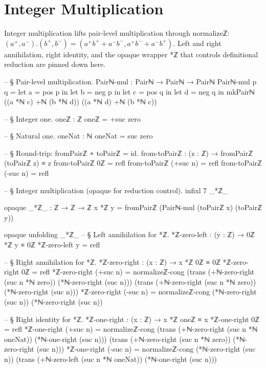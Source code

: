 \documentclass[11pt,a4paper]{book}
\def\cdot{.}%
\def\texttt#1{#1}%
\begin{document}
\section{Integer Multiplication}

Integer multiplication lifts pair-level multiplication through \texttt{normalizeℤ}:
$(a^+,a^-) \cdot (b^+,b^-) = (a^+ b^+ + a^- b^-, a^+ b^- + a^- b^+)$.
Left and right annihilation, right identity, and the opaque wrapper \texttt{*ℤ} that controls definitional reduction are pinned down here.

\begin{code}
-- § Pair-level multiplication.
Pairℕ-mul : Pairℕ → Pairℕ → Pairℕ
Pairℕ-mul p q =
  let a = pos p in
  let b = neg p in
  let c = pos q in
  let d = neg q in
  mkPairℕ ((a *ℕ c) +ℕ (b *ℕ d)) ((a *ℕ d) +ℕ (b *ℕ c))

-- § Integer one.
oneℤ : ℤ
oneℤ = +suc zero

-- § Natural one.
oneNat : ℕ
oneNat = suc zero

-- § Round-trip: fromPairℤ ∘ toPairℤ = id.
from-toPairℤ : (z : ℤ) → fromPairℤ (toPairℤ z) ≡ z
from-toPairℤ 0ℤ = refl
from-toPairℤ (+suc n) = refl
from-toPairℤ (-suc n) = refl

-- § Integer multiplication (opaque for reduction control).
infixl 7 _*ℤ_

opaque
  _*ℤ_ : ℤ → ℤ → ℤ
  x *ℤ y = fromPairℤ (Pairℕ-mul (toPairℤ x) (toPairℤ y))

opaque
  unfolding _*ℤ_
  -- § Left annihilation for *ℤ.
  *ℤ-zero-left : (y : ℤ) → 0ℤ *ℤ y ≡ 0ℤ
  *ℤ-zero-left y = refl

  -- § Right annihilation for *ℤ.
  *ℤ-zero-right : (x : ℤ) → x *ℤ 0ℤ ≡ 0ℤ
  *ℤ-zero-right 0ℤ = refl
  *ℤ-zero-right (+suc n) =
    normalizeℤ-cong
      (trans
        (+ℕ-zero-right (suc n *ℕ zero))
        (*ℕ-zero-right (suc n)))
      (trans
        (+ℕ-zero-right (suc n *ℕ zero))
        (*ℕ-zero-right (suc n)))
  *ℤ-zero-right (-suc n) =
    normalizeℤ-cong
      (*ℕ-zero-right (suc n))
      (*ℕ-zero-right (suc n))

  -- § Right identity for *ℤ.
  *ℤ-one-right : (x : ℤ) → x *ℤ oneℤ ≡ x
  *ℤ-one-right 0ℤ = refl
  *ℤ-one-right (+suc n) =
    normalizeℤ-cong
      (trans
        (+ℕ-zero-right (suc n *ℕ oneNat))
        (*ℕ-one-right (suc n)))
      (trans
        (+ℕ-zero-right (suc n *ℕ zero))
        (*ℕ-zero-right (suc n)))
  *ℤ-one-right (-suc n) =
    normalizeℤ-cong
      (*ℕ-zero-right (suc n))
      (trans
        (+ℕ-zero-left (suc n *ℕ oneNat))
        (*ℕ-one-right (suc n)))
\end{code}
\end{document}
